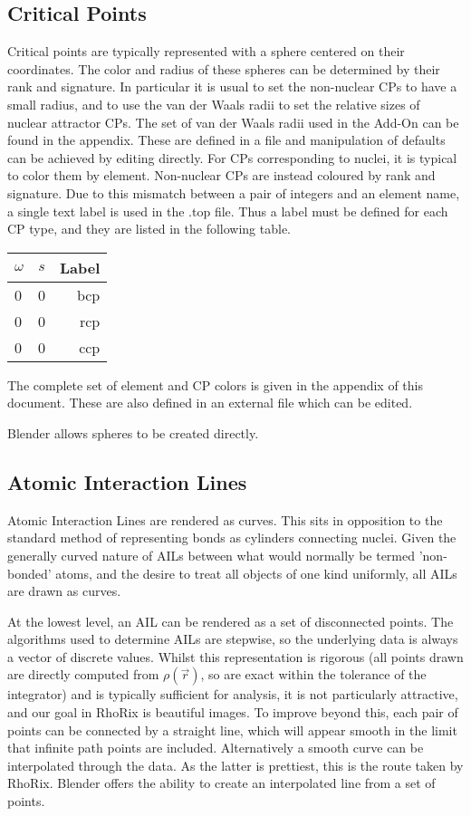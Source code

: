 \documentclass{tufte-book}
\newcommand{\programName}{RhoRix}
\begin{document}
\subsection{Critical Points}

Critical points are typically represented with a sphere centered on their coordinates.
The color and radius of these spheres can be determined by their rank and signature.
In particular it is usual to set the non-nuclear CPs to have a small radius, and to use the 
van der Waals radii to set the relative sizes of nuclear attractor CPs.
The set of van der Waals radii used in the Add-On can be found in the appendix.
These are defined in a file and manipulation of defaults can be achieved by editing directly.
For CPs corresponding to nuclei, it is typical to color them by element.
Non-nuclear CPs are instead coloured by rank and signature.
Due to this mismatch between a pair of integers and an element name, a single text label is used in the .top file.
Thus a label must be defined for each CP type, and they are listed in the following table.

\begin{tabular}{ l c || r }
$\omega$ & $s$ & Label \\
\hline
0 & 0 & bcp \\
0 & 0 & rcp \\
0 & 0 & ccp \\
\end{tabular}

The complete set of element and CP colors is given in the appendix of this document. 
These are also defined in an external file which can be edited.

Blender allows spheres to be created directly.

\subsection{Atomic Interaction Lines}

Atomic Interaction Lines are rendered as curves. This sits in opposition to the standard method of representing bonds as cylinders connecting nuclei. Given the generally curved nature of AILs between what would normally be termed 'non-bonded' atoms, and the desire to treat all objects of one kind uniformly, all AILs are drawn as curves.

At the lowest level, an AIL can be rendered as a set of disconnected points. The algorithms used to determine AILs are stepwise, so the underlying data is always a vector of discrete values.
Whilst this representation is rigorous (all points drawn are directly computed from $\rho(\vec{r})$, so are exact within the tolerance of the integrator) and is typically sufficient for analysis, it is not particularly attractive, and our goal in \programName{} is beautiful images.
To improve beyond this, each pair of points can be connected by a straight line, which will appear smooth in the limit that infinite path points are included. Alternatively a smooth curve can be interpolated through the data.
As the latter is prettiest, this is the route taken by \programName{}.
Blender offers the ability to create an interpolated line from a set of points.
\end{document}
